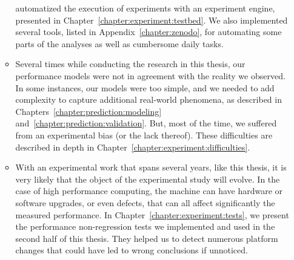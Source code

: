 \begin{itemize}
\begin{itemize}
                        automatized the execution of experiments with an experiment engine, presented in
                        Chapter~\ref{chapter:experiment:testbed}. We also implemented several tools, listed in
                        Appendix~\ref{chapter:zenodo}, for automating some parts of the analyses as well as cumbersome
                        daily tasks.
                    \item Several times while conducting the research in this thesis, our performance models were not in
                        agreement with the
                        reality we observed. In some instances, our models were too simple, and we needed to add
                        complexity to capture additional real-world phenomena, as described in
                        Chapters~\ref{chapter:prediction:modeling} and~\ref{chapter:prediction:validation}. But, most of
                        the time, we suffered from an experimental bias (or the lack thereof). These difficulties are
                        described in depth in Chapter~\ref{chapter:experiment:difficulties}.
                    \item With an experimental work that spans several years, like this thesis, it is very likely that the
                        object of the experimental study will evolve. In the case of high performance computing, the
                        machine can
                        have hardware or software upgrades, or even defects, that can all affect significantly the
                        measured performance. In Chapter~\ref{chapter:experiment:tests}, we present the performance
                        non-regression tests we implemented and used in the second half of this thesis. They helped us
                        to detect numerous platform changes that could have led to wrong conclusions if unnoticed.
                \end{itemize}
        \end{itemize}


